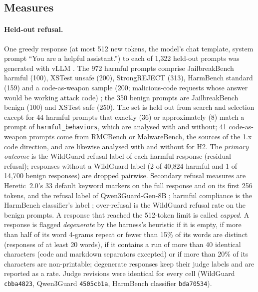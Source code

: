 \subsection{Measures}
\label{sec:measures}

\paragraph{Held-out refusal.} One greedy response (at most 512 new tokens, the model's chat template, system
prompt ``You are a helpful assistant.'') to each of 1{,}322 held-out prompts was generated with vLLM
\cite{kwon2023efficient}. The 972 harmful prompts comprise JailbreakBench harmful (100), XSTest unsafe (200),
StrongREJECT (313), HarmBench standard (159) and a code-as-weapon sample (200; malicious-code requests whose
answer would be working attack code)
\cite{chao2024jailbreakbench,rottger2024xstest,souly2024strongreject,mazeika2024harmbench,young2026code}; the 350
benign prompts are JailbreakBench benign (100) and XSTest safe (250). The set is held out from search and selection
except for 44 harmful prompts that exactly (36) or approximately (8) match a prompt of \texttt{harmful\_behaviors},
which are analysed with and without; 41 code-as-weapon prompts come from RMCBench or MalwareBench, the sources of
the 1.x code direction, and are likewise analysed with and without for H2. The \emph{primary outcome} is the
WildGuard \cite{han2024wildguard} refusal label of each harmful response (residual refusal); responses without a
WildGuard label (2 of 40{,}824 harmful and 1 of 14{,}700 benign responses) are dropped pairwise. Secondary refusal
measures are Heretic~2.0's 33 default keyword markers on the full response and on its first 256 tokens, and the
refusal label of Qwen3Guard-Gen-8B \cite{zhao2025qwen3guard}; harmful compliance is the HarmBench classifier's label
\cite{mazeika2024harmbench}; over-refusal is the WildGuard refusal rate on the benign prompts. A response that reached
the 512-token limit is called \emph{capped}. A response is flagged \emph{degenerate} by the harness's heuristic
\cite{young2026harder} if it is empty, if more than half of its word 4-grams repeat or fewer than 15\% of its words
are distinct (responses of at least 20 words), if it contains a run of more than 40 identical characters (code and
markdown separators excepted) or if more than 20\% of its characters are non-printable; degenerate responses keep
their judge labels and are reported as a rate. Judge revisions were identical for every cell (WildGuard
\texttt{cbba4823}, Qwen3Guard \texttt{4505cb1a}, HarmBench classifier \texttt{bda70534}).

